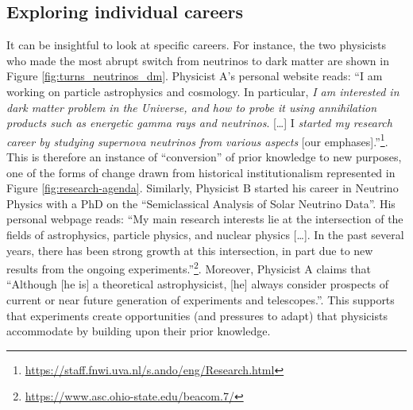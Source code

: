 \documentclass{article}
\begin{document}
\subsection{\label{appendix:cases}Exploring individual careers}

It can be insightful to look at specific careers. For instance, the two physicists who made the most abrupt switch from neutrinos to dark matter are shown in Figure \ref{fig:turns_neutrinos_dm}. Physicist A's personal website reads: ``I am working on particle astrophysics and cosmology. In particular, \textit{I am interested in dark matter problem in the Universe, and how to probe it using annihilation products such as energetic gamma rays and neutrinos}. [\dots]  I \textit{started my research career by studying supernova neutrinos from various aspects} [our emphases].''\footnote{\url{https://staff.fnwi.uva.nl/s.ando/eng/Research.html}}. This is therefore an instance of ``conversion'' of prior knowledge to new purposes, one of the forms of change drawn from historical institutionalism represented in Figure \ref{fig:research-agenda}. Similarly, Physicist B started his career in Neutrino Physics with a PhD on the ``Semiclassical Analysis of Solar Neutrino Data''.  His personal webpage reads: ``My main research interests lie at the intersection of the fields of astrophysics, particle physics, and nuclear physics [\dots]. In the past several years, there has been strong growth at this intersection, in part due to new results from the ongoing experiments.''\footnote{\url{https://www.asc.ohio-state.edu/beacom.7/}}. Moreover, Physicist A claims that ``Although [he is] a theoretical astrophysicist, [he] always consider prospects of current or near future generation of experiments and telescopes.''. This supports that experiments create opportunities (and pressures to adapt) that physicists accommodate by building upon their prior knowledge. 
\end{document}
